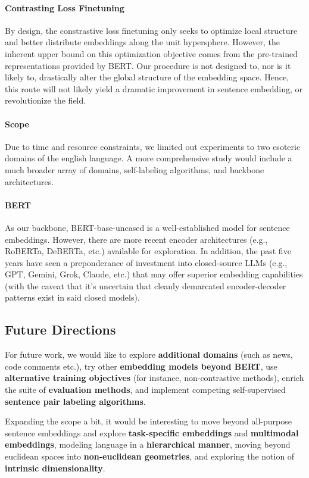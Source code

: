 \documentclass{article}
\begin{document}
\paragraph*{Contrasting Loss Finetuning} By design, the constrastive loss finetuning only seeks to optimize
local structure and better distribute embeddings along the unit hypersphere. However, the inherent upper
bound on this optimization objective comes from the pre-trained representations provided by BERT. Our
procedure is not designed to, nor is it likely to, drastically alter the global structure of the embedding
space. Hence, this route will not likely yield a dramatic improvement in sentence embedding, or revolutionize the field.

\paragraph*{Scope} Due to time and resource constraints, we limited out experiments to two esoteric domains
of the english language. A more comprehensive study would include a much broader array of domains,
self-labeling algorithms, and backbone architectures.

\paragraph*{BERT} As our backbone, BERT-base-uncased is a well-established model for sentence embeddings.
However, there are more recent encoder architectures (e.g., RoBERTa, DeBERTa, etc.) available for
exploration. In addition, the past five years have seen a preponderance of investment into closed-source LLMs
(e.g., GPT, Gemini, Grok, Claude, etc.) that may offer superior embedding capabilities (with the caveat that
it's uncertain that cleanly demarcated encoder-decoder patterns exist in said closed models).
\subsection{Future Directions}
For future work, we would like to explore \textbf{additional domains} (such as news, code
comments etc.), try other \textbf{embedding models beyond BERT}, use
\textbf{alternative training objectives} (for instance, non-contrastive methods), enrich the suite of
\textbf{evaluation methods}, and implement competing self-supervised \textbf{sentence pair labeling algorithms}.

Expanding the scope a bit, it would be interesting to move beyond all-purpose sentence embeddings and explore
\textbf{task-specific embeddings} and \textbf{multimodal embeddings}, modeling language in a
\textbf{hierarchical manner}, moving beyond euclidean spaces into \textbf{non-euclidean geometries}, and
exploring the notion of \textbf{intrinsic dimensionality}.
\end{document}
